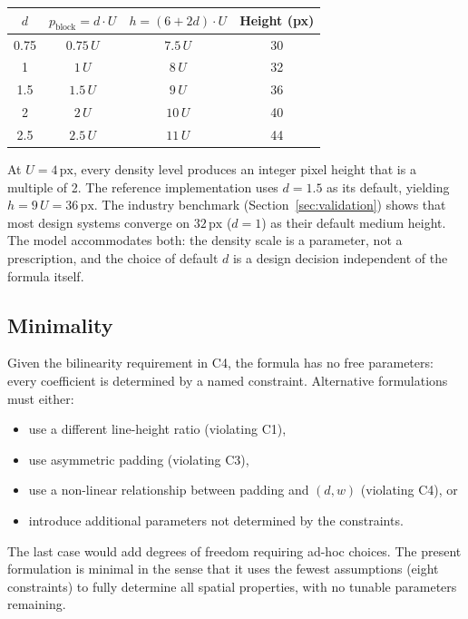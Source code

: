 \begin{center}
\begin{tabular}{cccc}
\toprule
$d$ & $p_{\text{block}} = d \cdot U$ & $h = (6 + 2d) \cdot U$ & Height (px) \\
\midrule
0.75 & $0.75\,U$ & $7.5\,U$ & 30 \\
1    & $1\,U$    & $8\,U$   & 32 \\
1.5  & $1.5\,U$  & $9\,U$   & 36 \\
2    & $2\,U$    & $10\,U$  & 40 \\
2.5  & $2.5\,U$  & $11\,U$  & 44 \\
\bottomrule
\end{tabular}
\end{center}

At $U = 4\,\text{px}$, every density level produces an integer pixel height that is a multiple of 2. The reference implementation uses $d = 1.5$ as its default, yielding $h = 9\,U = 36\,\text{px}$. The industry benchmark (Section~\ref{sec:validation}) shows that most design systems converge on $32\,\text{px}$ ($d = 1$) as their default medium height. The model accommodates both: the density scale is a parameter, not a prescription, and the choice of default $d$ is a design decision independent of the formula itself.

\subsection{Minimality}

Given the bilinearity requirement in C4, the formula has no free parameters: every coefficient is determined by a named constraint. Alternative formulations must either:
\begin{itemize}
  \item use a different line-height ratio (violating C1),
  \item use asymmetric padding (violating C3),
  \item use a non-linear relationship between padding and $(d, w)$ (violating C4), or
  \item introduce additional parameters not determined by the constraints.
\end{itemize}

The last case would add degrees of freedom requiring ad-hoc choices. The present formulation is minimal in the sense that it uses the fewest assumptions (eight constraints) to fully determine all spatial properties, with no tunable parameters remaining.

